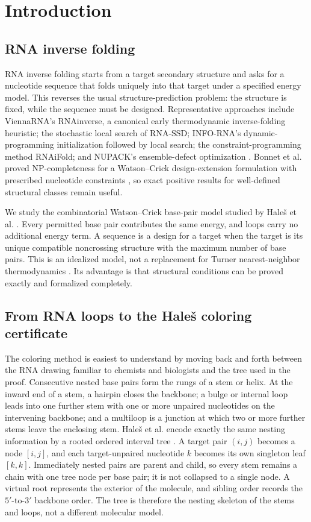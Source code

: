 \documentclass[11pt]{article}
\begin{document}
\section{Introduction}

\subsection{RNA inverse folding}

RNA inverse folding starts from a target secondary structure and asks for a nucleotide sequence that folds uniquely into that target under a specified energy model.  This reverses the usual structure-prediction problem: the structure is fixed, while the sequence must be designed.  Representative approaches include ViennaRNA's RNAinverse, a canonical early thermodynamic inverse-folding heuristic; the stochastic local search of RNA-SSD; INFO-RNA's dynamic-programming initialization followed by local search; the constraint-programming method RNAiFold; and NUPACK's ensemble-defect optimization \citep{hofacker1994,andronescu2004,busch2006,garciamartin2013,zadeh2011}.  Bonnet et al. proved NP-completeness for a Watson--Crick design-extension formulation with prescribed nucleotide constraints \citep{bonnet2020}, so exact positive results for well-defined structural classes remain useful.

We study the combinatorial Watson--Crick base-pair model studied by Hale\v{s} et al. \citep{hales2017}.  Every permitted base pair contributes the same energy, and loops carry no additional energy term.  A sequence is a design for a target when the target is its unique compatible noncrossing structure with the maximum number of base pairs.  This is an idealized model, not a replacement for Turner nearest-neighbor thermodynamics \citep{turner2010}.  Its advantage is that structural conditions can be proved exactly and formalized completely.

\subsection{From RNA loops to the Hale\v{s} coloring certificate}

The coloring method is easiest to understand by moving back and forth between the RNA drawing familiar to chemists and biologists and the tree used in the proof.  Consecutive nested base pairs form the rungs of a stem or helix.  At the inward end of a stem, a hairpin closes the backbone; a bulge or internal loop leads into one further stem with one or more unpaired nucleotides on the intervening backbone; and a multiloop is a junction at which two or more further stems leave the enclosing stem.  Hale\v{s} et al. encode exactly the same nesting information by a rooted ordered interval tree \citep{hales2017}.  A target pair $(i,j)$ becomes a node $[i,j]$, and each target-unpaired nucleotide $k$ becomes its own singleton leaf $[k,k]$.  Immediately nested pairs are parent and child, so every stem remains a chain with one tree node per base pair; it is not collapsed to a single node.  A virtual root represents the exterior of the molecule, and sibling order records the $5'$-to-$3'$ backbone order.  The tree is therefore the nesting skeleton of the stems and loops, not a different molecular model.
\end{document}
